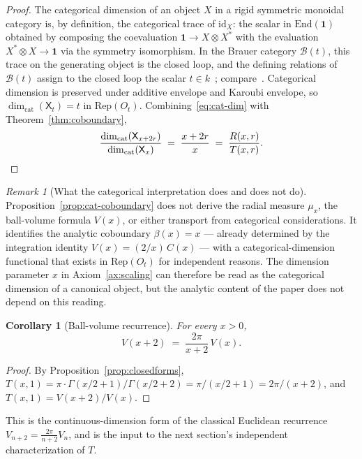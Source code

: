 \documentclass[11pt,a4paper]{article}
\theoremstyle{plain}
\newtheorem{corollary}[theorem]{Corollary}
\theoremstyle{definition}
\theoremstyle{remark}
\newtheorem{remark}[theorem]{Remark}
\begin{document}
\begin{proof}
The categorical dimension of an object $X$ in a rigid symmetric monoidal category is, by definition, the categorical trace of $\mathrm{id}_X$: the scalar in $\mathrm{End}(\mathbf 1)$ obtained by composing the coevaluation $\mathbf 1 \to X\otimes X^*$ with the evaluation $X^*\otimes X\to\mathbf 1$ via the symmetry isomorphism. In the Brauer category $\mathcal B(t)$, this trace on the generating object is the closed loop, and the defining relations of $\mathcal B(t)$ assign to the closed loop the scalar $t\in k$~\cite[\S 2.1]{ComesHeidersdorf2017}; compare~\cite[\S 9.2]{Deligne2007}. Categorical dimension is preserved under additive envelope and Karoubi envelope, so $\dim_{\mathrm{cat}}(\mathsf X_t) = t$ in $\mathrm{Rep}(O_t)$. Combining~\eqref{eq:cat-dim} with Theorem~\ref{thm:coboundary},
\[
\frac{\dim_{\mathrm{cat}}(\mathsf X_{x+2r})}{\dim_{\mathrm{cat}}(\mathsf X_x)} \;=\; \frac{x+2r}{x} \;=\; \frac{R(x,r)}{T(x,r)}. \qedhere
\]
\end{proof}

\begin{remark}[What the categorical interpretation does and does not do]\label{rmk:cat-scope}
Proposition~\ref{prop:cat-coboundary} does not derive the radial measure $\mu_x$, the ball-volume formula $V(x)$, or either transport from categorical considerations. It identifies the analytic coboundary $\beta(x)=x$ — already determined by the integration identity $V(x) = (2/x)\,C(x)$ — with a categorical-dimension functional that exists in $\mathrm{Rep}(O_t)$ for independent reasons. The dimension parameter $x$ in Axiom~\ref{ax:scaling} can therefore be read as the categorical dimension of a canonical object, but the analytic content of the paper does not depend on this reading.
\end{remark}

\begin{corollary}[Ball-volume recurrence]\label{cor:recurrence}
For every $x>0$,
\[
V(x+2) \;=\; \frac{2\pi}{x+2}\,V(x).
\]
\end{corollary}

\begin{proof}
By Proposition~\ref{prop:closedforms}, $T(x,1)=\pi\cdot\Gamma(x/2+1)/\Gamma(x/2+2)=\pi/(x/2+1)=2\pi/(x+2)$, and $T(x,1)=V(x+2)/V(x)$.
\end{proof}

This is the continuous-dimension form of the classical Euclidean recurrence $V_{n+2}=\frac{2\pi}{n+2}V_n$, and is the input to the next section's independent characterization of $T$.
\end{document}
